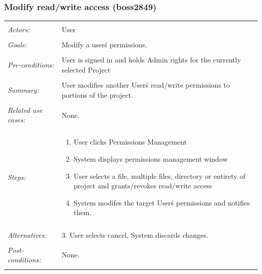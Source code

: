 \documentclass[11pt]{article}
\begin{document}
\subsubsection{Modify read/write access (boss2849)}
\begin{tabular}{ p{2cm} p{12cm} }
 \hline
 \\
 \textit{Actors:} & User \\ 
 \\
 \textit{Goals:} & Modify a user\'s permissions. \\
 \\
 \textit{Pre-conditions:} & User is signed in and holds Admin rights for the currently selected Project\\
 \\
 \textit{Summary:} & User modifies another User\'s read/write permissions to portions of the project. \\
 \\
 \textit{Related use cases:} & None. \\ 
 \\
 \textit{Steps:} & \begin{enumerate}
  \item User clicks Permissions Management
  \item System displays permissions management window
  \item User selects a file, multiple files, directory or entirety of project and grants/revokes read/write access
  \item System modifes the target User\'s permissions and notifies them.
 \end{enumerate} \\
 \\
 \textit{Alternatives:} & 3. User selects cancel, System discards changes. \\
 \\
 \textit{Post-conditions:} & None. \\
 \\
\hline
\end{tabular}
\end{document}
